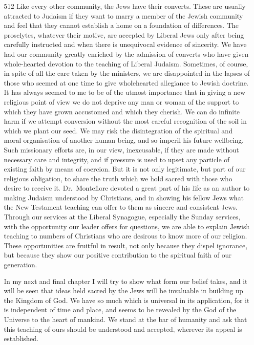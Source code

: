 \begin{tp}{512}
Like every other community, the Jews have their
converts. These are usually attracted to Judaism if they
want to marry a member of the Jewish community and
feel that they cannot establish a home on a foundation
of differences. The proselytes, whatever their motive,
are accepted by Liberal Jews only after being carefully
instructed and when there is unequivocal evidence of
sincerity. We have had our community greatly enriched
by the admission of converts who have given whole-hearted
devotion to the teaching of Liberal Judaism.
Sometimes, of course, in spite of all the care taken by
the ministers, we are disappointed in the lapses of those
who seemed at one time to give wholehearted allegiance
to Jewish doctrine. It has always seemed to me to be
of the utmost importance that in giving a new religious
point of view we do not deprive any man or woman of the
support to which they have grown accustomed and which
they cherish. We can do infinite harm if we attempt
conversion without the most careful recognition of the
soil in which we plant our seed. We may risk the
disintegration of the spiritual and moral organisation of
another human being, and so imperil his future wellbeing.
Such missionary efforts are, in our view, inexcusable,
if they are made without necessary care and
integrity, and if pressure is used to upset any particle
of existing faith by means of coercion. But it
is not only legitimate, but part of our religious obligation,
to share the truth which we hold sacred with
those who desire to receive it. Dr.\ Montefiore devoted
a great part of his life as an author to making Judaism
understood by Christians, and in showing his fellow
Jews what the New Testament teaching can offer to
them as sincere and consistent Jews. Through our
services at the Liberal Synagogue, especially the Sunday
services, with the opportunity our leader offers for
questions, we are able to explain Jewish teaching to
numbers of Christians who are desirous to know more of
our religion. These opportunities are fruitful in result,
not only because they dispel ignorance, but because they
show our positive contribution to the spiritual faith of
our generation.
\end{tp}

In my next and final chapter I will try to show what
form our belief takes, and it will be seen that ideas held
sacred by the Jews will be invaluable in building up the
Kingdom of God. We have so much which is universal
in its application, for it is independent of time and
place, and seems to be revealed by the God of the Universe
to the heart of mankind. We stand at the bar of humanity
and ask that this teaching of ours should be understood
and accepted, wherever its appeal is established.
